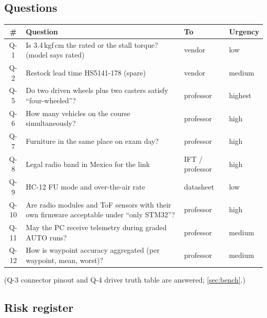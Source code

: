 \documentclass[11pt,a4paper]{article}
\newcommand{\tb}[1]{{\small\textcolor{bad}{\textsf{#1}}}}
\begin{document}
\subsection{Questions}\label{sec:open-questions}

\begin{center}
\small
\begin{tabularx}{\textwidth}{@{}cLP{24mm}l@{}}
\toprule
\# & \textbf{Question} & \textbf{To} & \textbf{Urgency}\\
\midrule
Q-1 & Is 3.4\,kgf\,cm the rated or the stall torque? (model says rated) & vendor & low\\
Q-2 & Restock lead time HS5141-178 (spare) & vendor & medium\\
Q-5 & Do two driven wheels plus two casters satisfy ``four-wheeled''? & professor & \tb{highest}\\
Q-6 & How many vehicles on the course simultaneously? & professor & high\\
Q-7 & Furniture in the same place on exam day? & professor & high\\
Q-8 & Legal radio band in Mexico for the link & IFT / professor & high\\
Q-9 & HC-12 FU mode and over-the-air rate & datasheet & low\\
Q-10 & Are radio modules and ToF sensors with their own firmware acceptable under ``only STM32''? & professor & high\\
Q-11 & May the PC receive telemetry during graded AUTO runs? & professor & medium\\
Q-12 & How is waypoint accuracy aggregated (per waypoint, mean, worst)? & professor & medium\\
\bottomrule
\end{tabularx}
\end{center}
(Q-3 connector pinout and Q-4 driver truth table are answered; \cref{sec:bench}.)

\subsection{Risk register}
\end{document}
